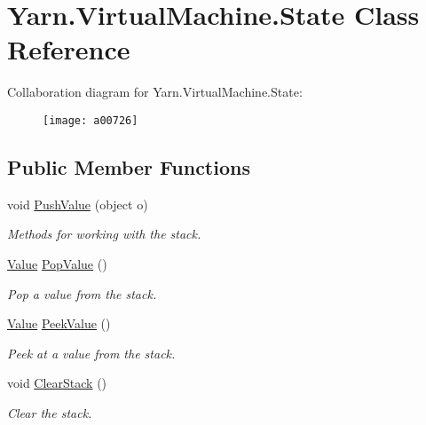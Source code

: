 \hypertarget{a00165}{\section{Yarn.\-Virtual\-Machine.\-State Class Reference}
\label{a00165}
}


Collaboration diagram for Yarn.\-Virtual\-Machine.\-State\-:
\nopagebreak
\begin{figure}[H]
\begin{center}
\leavevmode
\texttt{[image: a00726]}
\end{center}
\end{figure}
\subsection*{Public Member Functions}
\begin{DoxyCompactItemize}
\item 
void \hyperlink{a00165_aace44f5b85b9f746fede834becda4a8e}{Push\-Value} (object o)
\begin{DoxyCompactList}\small\item\em Methods for working with the stack. \end{DoxyCompactList}\item 
\hyperlink{a00187}{Value} \hyperlink{a00165_a36881a888ea2839d74c3d4e7c199f4ee}{Pop\-Value} ()
\begin{DoxyCompactList}\small\item\em Pop a value from the stack. \end{DoxyCompactList}\item 
\hyperlink{a00187}{Value} \hyperlink{a00165_a54fd5b64ec94e937e771846167242dc2}{Peek\-Value} ()
\begin{DoxyCompactList}\small\item\em Peek at a value from the stack. \end{DoxyCompactList}\item 
void \hyperlink{a00165_a9c787097fbbbbf1680e4960cda092535}{Clear\-Stack} ()
\begin{DoxyCompactList}\small\item\em Clear the stack. \end{DoxyCompactList}\end{DoxyCompactItemize}
